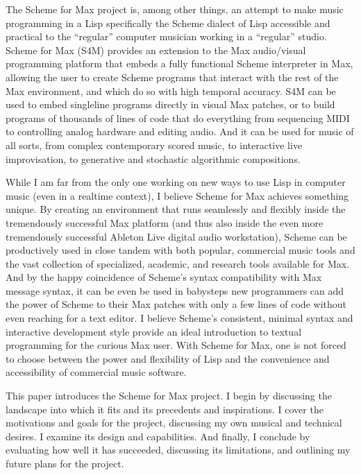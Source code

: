 \documentclass[letterpaper,10pt,english]{sphinxmanual}
\begin{document}
\sphinxAtStartPar
The Scheme for Max project is, among other things, an attempt to make music programming in a Lisp
\sphinxhyphen{} specifically the Scheme dialect of Lisp \sphinxhyphen{} accessible and practical to the “regular” computer musician working in a “regular” studio.
Scheme for Max (S4M) provides an extension to the Max audio/visual programming platform
that embeds a fully functional Scheme interpreter in Max, allowing the user to create Scheme programs that
interact with the rest of the Max environment, and which do so with high temporal accuracy.
S4M can be used to embed single\sphinxhyphen{}line programs directly in visual Max patches, or to build
programs of thousands of lines of code that do everything from sequencing MIDI
to controlling analog hardware and editing audio.
And it can be used for music of all sorts, from complex contemporary scored music, to interactive
live improvisation, to generative and stochastic algorithmic compositions.

\sphinxAtStartPar
While I am far from the only one working on new ways to use Lisp in computer music (even in a realtime context),
I believe Scheme for Max achieves something unique.
By creating an environment that runs seamlessly and flexibly inside the tremendously successful
Max platform (and thus also inside the even more tremendously successful Ableton Live digital audio workstation),
Scheme can be productively used in close tandem with both popular,
commercial music tools and the vast collection of specialized, academic, and research tools available for Max.
And by the happy coincidence of Scheme’s syntax compatibility with Max message syntax, it can be even be used
in baby\sphinxhyphen{}steps \sphinxhyphen{} new programmers can add the power of Scheme to their Max patches with
only a few lines of code without even reaching for a text editor.
I believe Scheme’s consistent, minimal syntax and interactive development style provide an ideal
introduction to textual programming for the curious Max user.
With Scheme for Max, one is not forced to choose between the power and flexibility of Lisp and the
convenience and accessibility of commercial music software.

\sphinxAtStartPar
This paper introduces the Scheme for Max project. I begin by discussing the landscape into which it fits
and its precedents and inspirations. I cover the motivations and goals for the project, discussing
my own musical and technical desires.
I examine its design and capabilities. And finally, I conclude by evaluating
how well it has succeeded, discussing its limitations, and outlining my future plans for the project.
\end{document}
